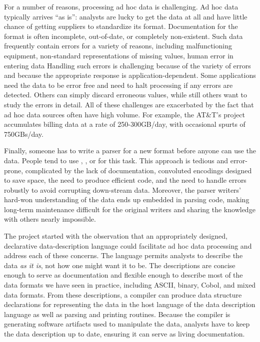 \documentclass{sig-alternate}
\begin{document}
For a number of reasons, processing ad hoc data is challenging.  Ad
hoc data typically arrives ``as is'': analysts are lucky to get the
data at all and have little chance of getting suppliers to standardize
its format.  Documentation for the format is often incomplete,
out-of-date, or completely non-existent.  Such data frequently contain
errors for a variety of reasons, including malfunctioning equipment,
non-standard representations of missing values, human error in
entering data \etc{}  Handling such errors is challenging because of
the variety of errors and because the appropriate response is 
application-dependent. Some applications need the data to be error
free and need to halt processing if any errors are detected.  Others
can simply discard erroneous values, while still others want to study
the errors in detail.  All of these challenges are exacerbated by the
fact that ad hoc data sources often have high volume.  For example, 
the AT\&T's \ningaui{} project accumulates billing data at a rate
of 250-300GB/day, with occasional spurts of 750GBs/day.

Finally, someone has to write a parser for a new format before anyone
can use the data. People tend to use \C{}, \perl{}, or \python{} for
this task.  This approach is tedious and error-prone, complicated by
the lack of documentation, convoluted encodings designed to save
space, the need to produce efficient code, and the need to handle
errors robustly to avoid corrupting down-stream data.  Moreover, the
parser writers' hard-won understanding of the data ends up embedded in
parsing code, making long-term maintenance difficult for the original
writers and sharing the knowledge with others nearly impossible.

The \pads{} project started with the observation that an appropriately
designed, declarative data-description language could facilitate ad
hoc data processing and address each of these concerns.  The
language permits analysts to describe the data \textit{as it is}, not
how one might want it to be. The descriptions are concise enough to
serve as documentation and flexible enough to describe most of the
data formats we have seen in practice, including ASCII, binary, Cobol,
and mixed data formats.  From these descriptions, a compiler can
produce data structure declarations for representing the data in the
host language of the data description language as well as parsing and
printing routines.  Because the compiler is generating software
artifacts used to manipulate the data, analysts have to keep the data
description up to date, ensuring it can serve as living documentation.
\end{document}
